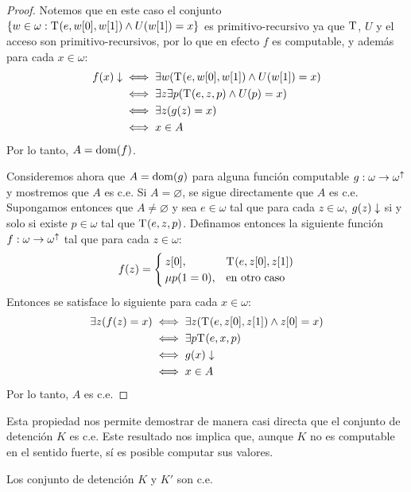 \begin{proof}
	Notemos que en este caso el conjunto $\set*{w\in\omega: \KLEENE\pa*{e, w\bra*{0}, w\bra*{1}}\land U\pa*{w\bra*{1}} = x}$ es primitivo-recursivo ya que $\mathrm{T}^{}$, $U$ y el acceso son primitivo-recursivos, por lo que en efecto $f$ es computable, y además para cada $x\in\omega$:
	\begin{align*}
		f\pa*{x}\ACABA&\iff\exists w\pa*{\KLEENE\pa*{e, w\bra*{0}, w\bra*{1}}\land U\pa*{w\bra*{1}} = x}\\
		&\iff\exists z\exists p\pa*{\KLEENE\pa*{e, z, p}\land U\pa*{p} = x}\\
		&\iff\exists z\pa*{g\pa*{z} = x}\\
		&\iff x\in A
	\end{align*}
	Por lo tanto, $A =\DOMINIO{f}$.

	Consideremos ahora que $A =\DOMINIO{g}$ para alguna función computable $g:\omega\to\omega^{\uparrow}$ y mostremos que $A$ es c.e. Si $A =\varnothing$, se sigue directamente que $A$ es c.e. Supongamos entonces que $A\neq\varnothing$ y sea $e\in\omega$ tal que para cada $z\in\omega$, $g\pa*{z}\ACABA$ si y solo si existe $p\in\omega$ tal que $\KLEENE\pa*{e, z, p}$. Definamos entonces la siguiente función $f:\omega\to\omega^{\uparrow}$ tal que para cada $z\in\omega$:
	\[
		f\pa*{z} =
		\begin{cases}
			z\bra*{0}, & \KLEENE\pa*{e, z\bra*{0}, z\bra*{1}}\\
			\mu p\pa*{1 = 0}, &\text{en otro caso}
		\end{cases}
	\]
	Entonces se satisface lo siguiente para cada $x\in\omega$:
	\begin{align*}
		\exists z\pa*{f\pa*{z} = x} &\iff\exists z\pa*{\KLEENE\pa*{e, z\bra*{0}, z\bra*{1}}\land z\bra*{0} = x}\\
		&\iff\exists p \KLEENE\pa*{e, x, p}\\
		&\iff g\pa*{x}\ACABA\\
		&\iff x\in A
	\end{align*}
	Por lo tanto, $A$ es c.e.
\end{proof}

Esta propiedad nos permite demostrar de manera casi directa que el conjunto de detención $K$ es c.e. Este resultado nos implica que, aunque $K$ no es computable en el sentido fuerte, sí es posible computar sus valores.

\begin{coll}
	Los conjunto de detención $K$ y $K'$ son c.e.
\end{coll}

